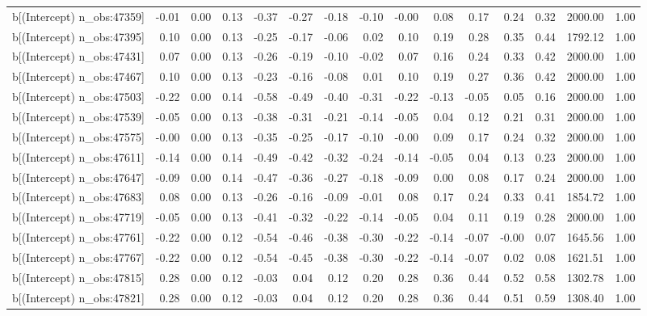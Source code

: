 \begin{table}[ht]
\begin{tabular}{rrrrrrrrrrrrrrr}
  b[(Intercept) n\_obs:47359] & -0.01 & 0.00 & 0.13 & -0.37 & -0.27 & -0.18 & -0.10 & -0.00 & 0.08 & 0.17 & 0.24 & 0.32 & 2000.00 & 1.00 \\ 
  b[(Intercept) n\_obs:47395] & 0.10 & 0.00 & 0.13 & -0.25 & -0.17 & -0.06 & 0.02 & 0.10 & 0.19 & 0.28 & 0.35 & 0.44 & 1792.12 & 1.00 \\ 
  b[(Intercept) n\_obs:47431] & 0.07 & 0.00 & 0.13 & -0.26 & -0.19 & -0.10 & -0.02 & 0.07 & 0.16 & 0.24 & 0.33 & 0.42 & 2000.00 & 1.00 \\ 
  b[(Intercept) n\_obs:47467] & 0.10 & 0.00 & 0.13 & -0.23 & -0.16 & -0.08 & 0.01 & 0.10 & 0.19 & 0.27 & 0.36 & 0.42 & 2000.00 & 1.00 \\ 
  b[(Intercept) n\_obs:47503] & -0.22 & 0.00 & 0.14 & -0.58 & -0.49 & -0.40 & -0.31 & -0.22 & -0.13 & -0.05 & 0.05 & 0.16 & 2000.00 & 1.00 \\ 
  b[(Intercept) n\_obs:47539] & -0.05 & 0.00 & 0.13 & -0.38 & -0.31 & -0.21 & -0.14 & -0.05 & 0.04 & 0.12 & 0.21 & 0.31 & 2000.00 & 1.00 \\ 
  b[(Intercept) n\_obs:47575] & -0.00 & 0.00 & 0.13 & -0.35 & -0.25 & -0.17 & -0.10 & -0.00 & 0.09 & 0.17 & 0.24 & 0.32 & 2000.00 & 1.00 \\ 
  b[(Intercept) n\_obs:47611] & -0.14 & 0.00 & 0.14 & -0.49 & -0.42 & -0.32 & -0.24 & -0.14 & -0.05 & 0.04 & 0.13 & 0.23 & 2000.00 & 1.00 \\ 
  b[(Intercept) n\_obs:47647] & -0.09 & 0.00 & 0.14 & -0.47 & -0.36 & -0.27 & -0.18 & -0.09 & 0.00 & 0.08 & 0.17 & 0.24 & 2000.00 & 1.00 \\ 
  b[(Intercept) n\_obs:47683] & 0.08 & 0.00 & 0.13 & -0.26 & -0.16 & -0.09 & -0.01 & 0.08 & 0.17 & 0.24 & 0.33 & 0.41 & 1854.72 & 1.00 \\ 
  b[(Intercept) n\_obs:47719] & -0.05 & 0.00 & 0.13 & -0.41 & -0.32 & -0.22 & -0.14 & -0.05 & 0.04 & 0.11 & 0.19 & 0.28 & 2000.00 & 1.00 \\ 
  b[(Intercept) n\_obs:47761] & -0.22 & 0.00 & 0.12 & -0.54 & -0.46 & -0.38 & -0.30 & -0.22 & -0.14 & -0.07 & -0.00 & 0.07 & 1645.56 & 1.00 \\ 
  b[(Intercept) n\_obs:47767] & -0.22 & 0.00 & 0.12 & -0.54 & -0.45 & -0.38 & -0.30 & -0.22 & -0.14 & -0.07 & 0.02 & 0.08 & 1621.51 & 1.00 \\ 
  b[(Intercept) n\_obs:47815] & 0.28 & 0.00 & 0.12 & -0.03 & 0.04 & 0.12 & 0.20 & 0.28 & 0.36 & 0.44 & 0.52 & 0.58 & 1302.78 & 1.00 \\ 
  b[(Intercept) n\_obs:47821] & 0.28 & 0.00 & 0.12 & -0.03 & 0.04 & 0.12 & 0.20 & 0.28 & 0.36 & 0.44 & 0.51 & 0.59 & 1308.40 & 1.00 \\ 

\end{tabular}
\end{table}
